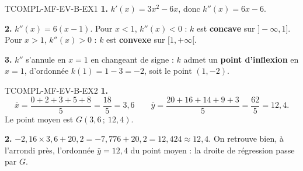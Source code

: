 %
\begin{corrige}{TCOMPL-MF-EV-B-EX1}
\textbf{1.} $k'(x) = 3x^2 - 6x$, donc $k''(x) = 6x - 6$.

\textbf{2.} $k''(x) = 6(x-1)$. Pour $x<1$, $k''(x)<0$ : $k$ est \textbf{concave} sur $]-\infty,1]$. Pour $x>1$, $k''(x)>0$ : $k$ est \textbf{convexe} sur $[1,+\infty[$.

\textbf{3.} $k''$ s'annule en $x=1$ en changeant de signe : $k$ admet un \textbf{point d'inflexion} en $x=1$, d'ordonnée $k(1) = 1-3=-2$, soit le point $(1,-2)$.
\end{corrige}

\begin{corrige}{TCOMPL-MF-EV-B-EX2}
\textbf{1.}
\[
  \bar{x} = \frac{0+2+3+5+8}{5} = \frac{18}{5} = 3{,}6
  \qquad
  \bar{y} = \frac{20+16+14+9+3}{5} = \frac{62}{5} = 12{,}4.
\]
Le point moyen est $G(3{,}6\,;\ 12{,}4)$.

\textbf{2.} $-2{,}16 \times 3{,}6 + 20{,}2 = -7{,}776+20{,}2 = 12{,}424 \approx 12{,}4$. On retrouve bien, à l'arrondi près, l'ordonnée $\bar{y}=12{,}4$ du point moyen : la droite de régression passe par $G$.
\end{corrige}
